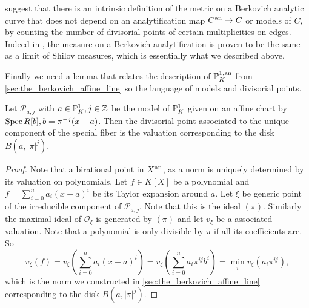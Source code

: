 \begin{remark}
	 suggest that there is an intrinsic definition of the metric on a Berkovich analytic curve that does not depend on an analytification map $ C{}^{\text{an}} \to C$ or models of $C$, by counting the number of divisorial points of certain multiplicities on edges. 
	Indeed in \cite{jonssonConvergenceAdicPluricanonical2020a}, the measure on a Berkovich analytification is proven to be the same as a limit of Shilov measures, which is essentially what we described above. 
\end{remark}

Finally we need a lemma that relates the description of $\mathbb{P}^{1, \text{an}}_{K}$ from \cref{sec:the_berkovich_affine_line} so the language of models and divisorial points. 

\begin{lemma}\label{lem:model_disk_proj_line}
	Let $\mathscr P_{a,j}$ with $a \in \mathbb{P}_K^{1}, j \in \mathbb{Z}$ be the model of $\mathscr {\mathbb{P}}_{K}^{1}$ given on an affine chart by $\operatorname{Spec} R[b], b = \pi^{-j}(x - a)$.
	Then the divisorial point associated to the unique component of the special fiber is the valuation corresponding to the disk $B(a, |\pi|^{j})$. 
\end{lemma}
\begin{proof}
	Note that a birational point in $X{}^{\text{an}}$, as a norm is uniquely determined by its valuation on polynomials. 
	Let $f \in K[X]$ be a polynomial and $f = \sum_{i = 0}^{n} a_i (x - a)^{i} $ be its Taylor expansion around $a$. 
	Let $\xi$ be generic point of the irreducible component of $\mathscr P_{a, j}$. 
	Note that this is the ideal $(\pi)$.
	Similarly the maximal ideal of $\mathcal{O}_{\xi}$ is generated by $(\pi)$ and let $v_{\xi}$ be a associated valuation.
	Note that a polynomial is only divisible by $\pi$ if all its coefficients are.
	So \[
		v_\xi(f) = v_\xi\left( \sum_{i = 0}^{n} a_{i} (x-a)^{i} \right) = v_\xi\left( \sum_{i = 0}^{n} a_i\pi^{ij}b^{i} \right) = \min_{i} v_{\xi}(a_i \pi^{ij}) 
	,\]
	which is the norm we constructed in \cref{sec:the_berkovich_affine_line} corresponding to the disk $B(a, |\pi|^{j})$.
\end{proof}


